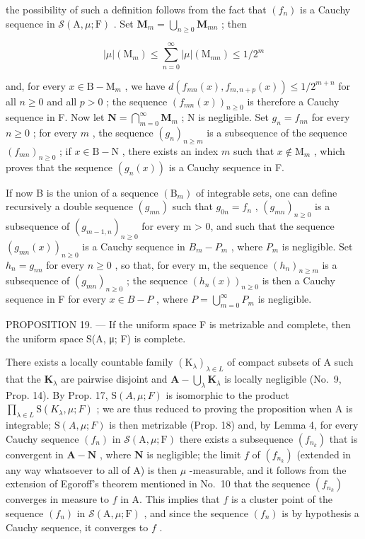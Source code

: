 the possibility of such a definition follows from the fact that \((f_n)\) is a Cauchy sequence in \(\mathcal{S}(\mathrm{A},\mu ;\mathrm{F})\) . Set \(\mathbf{M}_m = \bigcup_{n\geqslant 0}\mathbf{M}_{mn}\) ; then

\[
| \mu | (\mathrm{M} _ {m}) \leqslant \sum_ {n = 0} ^ {\infty} | \mu | (\mathrm{M} _ {m n}) \leqslant 1 / 2 ^ {m}
\]

and, for every \(x \in \mathrm{B} - \mathrm{M}_m\) , we have \(d(f_{mn}(x), f_{m,n+p}(x)) \leqslant 1/2^{m+n}\) for all \(n \geqslant 0\) and all \(p > 0\) ; the sequence \((f_{mn}(x))_{n \geqslant 0}\) is therefore a Cauchy sequence in F. Now let \(\mathbf{N} = \bigcap_{m=0}^{\infty} \mathbf{M}_m\) ; N is negligible. Set \(g_n = f_{nn}\) for every \(n \geqslant 0\) ; for every \(m\) , the sequence \((g_n)_{n \geqslant m}\) is a subsequence of the sequence \((f_{mn})_{n \geqslant 0}\) ; if \(x \in \mathrm{B} - \mathrm{N}\) , there exists an index \(m\) such that \(x \notin \mathrm{M}_m\) , which proves that the sequence \((g_n(x))\) is a Cauchy sequence in F.

If now B is the union of a sequence \((\mathrm{B}_{m})\) of integrable sets, one can define recursively a double sequence \((g_{mn})\) such that \(g_{0n} = f_{n}\) , \((g_{mn})_{n \geqslant 0}\) is a subsequence of \((g_{m-1,n})_{n \geqslant 0}\) for every m \textgreater{} 0, and such that the sequence \((g_{mn}(x))_{n \geqslant 0}\) is a Cauchy sequence in \(B_{m} - P_{m}\) , where \(P_{m}\) is negligible. Set \(h_{n} = g_{nn}\) for every \(n \geqslant 0\) , so that, for every m, the sequence \((h_{n})_{n \geqslant m}\) is a subsequence of \((g_{mn})_{n \geqslant 0}\) ; the sequence \((h_{n}(x))_{n \geqslant 0}\) is then a Cauchy sequence in F for every \(x \in B - P\) , where \(P = \bigcup_{m=0}^{\infty} P_{m}\) is negligible.

PROPOSITION 19. --- If the uniform space F is metrizable and complete, then the uniform space S(A, μ; F) is complete.

There exists a locally countable family \((\mathrm{K}_{\lambda})_{\lambda \in L}\) of compact subsets of A such that the \(\mathbf{K}_{\lambda}\) are pairwise disjoint and \(\mathbf{A} - \bigcup_{\lambda}\mathbf{K}_{\lambda}\) is locally negligible (No.~9, Prop. 14). By Prop. 17, \(\mathrm{S}(A,\mu;F)\) is isomorphic to the product \(\prod_{\lambda \in L}\mathrm{S}(K_{\lambda},\mu;F)\) ; we are thus reduced to proving the proposition when A is integrable; \(\mathrm{S}(A,\mu;F)\) is then metrizable (Prop. 18) and, by Lemma 4, for every Cauchy sequence \((f_n)\) in \(\mathcal{S}(\mathrm{A},\mu;\mathrm{F})\) there exists a subsequence \((f_{n_k})\) that is convergent in \(\mathbf{A} - \mathbf{N}\) , where \(\mathbf{N}\) is negligible; the limit \(f\) of \((f_{n_k})\) (extended in any way whatsoever to all of A) is then \(\mu\) -measurable, and it follows from the extension of Egoroff's theorem mentioned in No.~10 that the sequence \((f_{n_k})\) converges in measure to \(f\) in A. This implies that \(f\) is a cluster point of the sequence \((f_n)\) in \(\mathcal{S}(\mathrm{A},\mu;\mathrm{F})\) , and since the sequence \((f_n)\) is by hypothesis a Cauchy sequence, it converges to \(f\) .

